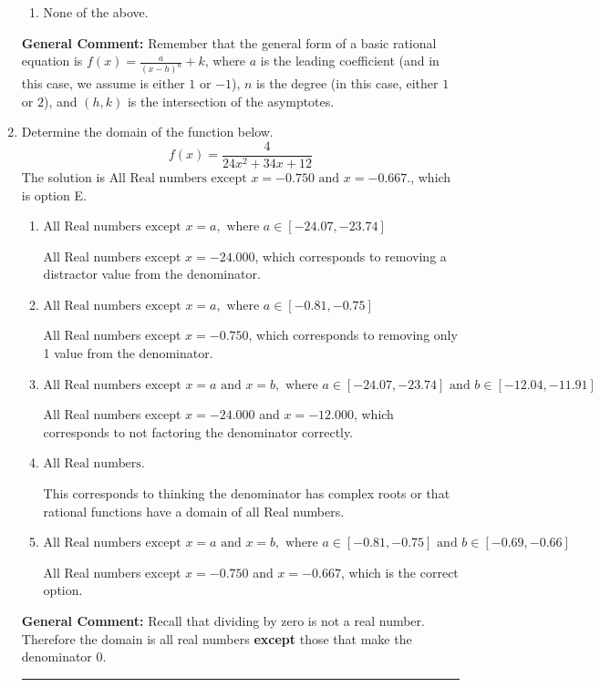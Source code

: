 \documentclass{extbook}[14pt]
\newcommand{\litem}[1]{\item #1

\rule{\textwidth}{0.4pt}}
\begin{document}
\begin{enumerate}
{\begin{enumerate}[label=\Alph*.]
\item None of the above.\end{enumerate}
\textbf{General Comment:} Remember that the general form of a basic rational equation is $ f(x) = \frac{a}{(x-h)^n} + k$, where $a$ is the leading coefficient (and in this case, we assume is either $1$ or $-1$), $n$ is the degree (in this case, either $1$ or $2$), and $(h, k)$ is the intersection of the asymptotes.
}
\litem{
Determine the domain of the function below.
\[ f(x) = \frac{4}{24x^{2} +34 x + 12} \]The solution is \( \text{All Real numbers except } x = -0.750 \text{ and } x = -0.667. \), which is option E.\begin{enumerate}[label=\Alph*.]
\item \( \text{All Real numbers except } x = a, \text{ where } a \in [-24.07, -23.74] \)

All Real numbers except $x = -24.000$, which corresponds to removing a distractor value from the denominator.
\item \( \text{All Real numbers except } x = a, \text{ where } a \in [-0.81, -0.75] \)

All Real numbers except $x = -0.750$, which corresponds to removing only 1 value from the denominator.
\item \( \text{All Real numbers except } x = a \text{ and } x = b, \text{ where } a \in [-24.07, -23.74] \text{ and } b \in [-12.04, -11.91] \)

All Real numbers except $x = -24.000$ and $x = -12.000$, which corresponds to not factoring the denominator correctly.
\item \( \text{All Real numbers.} \)

This corresponds to thinking the denominator has complex roots or that rational functions have a domain of all Real numbers.
\item \( \text{All Real numbers except } x = a \text{ and } x = b, \text{ where } a \in [-0.81, -0.75] \text{ and } b \in [-0.69, -0.66] \)

All Real numbers except $x = -0.750$ and $x = -0.667$, which is the correct option.
\end{enumerate}

\textbf{General Comment:} Recall that dividing by zero is not a real number. Therefore the domain is all real numbers \textbf{except} those that make the denominator 0.
}
\end{enumerate}
\end{document}
